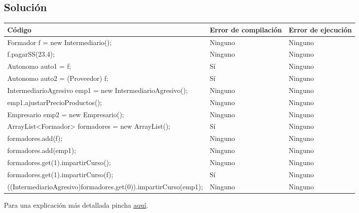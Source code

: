 \documentclass[a4paper,12pt]{article}
\begin{document}
\subsection{Solución}

\begin{table}[H]
    \centering
    \begin{tabular}{|l|p{2.5cm}|p{2 cm}|}
        \hline
        \textbf{Código} & \textbf{Error de compilación} & \textbf{Error de ejecución} \\ \hline
        Formador f = new Intermediario(); & Ninguno & Ninguno \\ \hline
        f.pagarSS(23.4); & Ninguno & Ninguno \\ \hline
        Autonomo auto1 = f; & Sí & Ninguno \\ \hline
        Autonomo auto2 = (Proveedor) f; & Sí & Ninguno \\ \hline
        IntermediarioAgresivo emp1 = new IntermediarioAgresivo(); & Ninguno & Ninguno \\ \hline
        emp1.ajustarPrecioProductos(); & Ninguno & Ninguno \\ \hline
        Empresario emp2 = new Empresario(); & Ninguno & Ninguno \\ \hline
        ArrayList<Formador> formadores = new ArrayList(); & Sí & Ninguno \\ \hline
        formadores.add(f); & Ninguno & Ninguno \\ \hline
        formadores.add(emp1); & Ninguno & Ninguno \\ \hline
        formadores.get(1).impartirCurso(); & Ninguno & Ninguno \\ \hline
        formadores.get(1).impartirCurso(f); & Sí & Ninguno \\ \hline
        ((IntermediarioAgresivo)formadores.get(0)).impartirCurso(emp1); & Ninguno & Ninguno \\ \hline
    \end{tabular}
\end{table}


Para una explicación más detallada pincha \href{https://github.com/ElblogdeIsmael/ElblogdeIsmael.github.io/tree/main/Subjects/Third/PDOO/Teoria/RelacionesEjercicios/Solt3/ETSIIT/explicacion_ej15.md}{aquí}.
\end{document}
